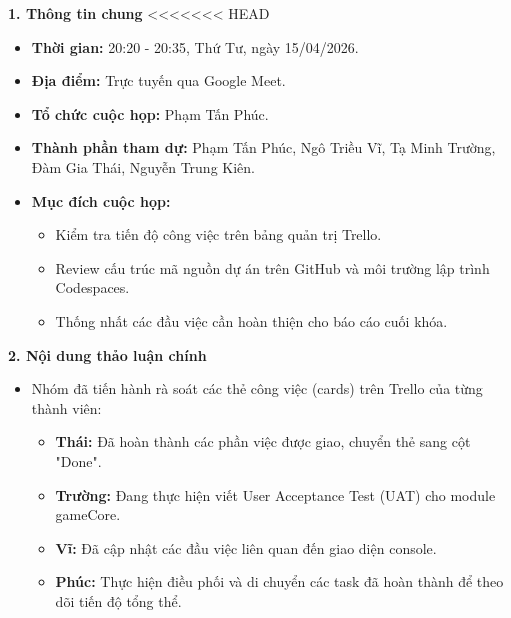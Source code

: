 \documentclass[12pt,a4paper]{article}
\begin{document}
\textbf{1. Thông tin chung}
<<<<<<< HEAD
\begin{itemize}
    \item \textbf{Thời gian:} 20:20 - 20:35, Thứ Tư, ngày 15/04/2026.
    \item \textbf{Địa điểm:} Trực tuyến qua Google Meet.
    \item \textbf{Tổ chức cuộc họp:} Phạm Tấn Phúc.
    \item \textbf{Thành phần tham dự:} Phạm Tấn Phúc, Ngô Triều Vĩ, Tạ Minh Trường, Đàm Gia Thái, Nguyễn Trung Kiên.
    \item \textbf{Mục đích cuộc họp:}
    \begin{itemize}
        \item Kiểm tra tiến độ công việc trên bảng quản trị Trello.
        \item Review cấu trúc mã nguồn dự án trên GitHub và môi trường lập trình Codespaces.
        \item Thống nhất các đầu việc cần hoàn thiện cho báo cáo cuối khóa.
    \end{itemize}
\end{itemize}

\vspace{4pt}
\textbf{2. Nội dung thảo luận chính}

\begin{itemize}
    \item Nhóm đã tiến hành rà soát các thẻ công việc (cards) trên Trello của từng thành viên:
    \begin{itemize}
        \item \textbf{Thái:} Đã hoàn thành các phần việc được giao, chuyển thẻ sang cột "Done".
        \item \textbf{Trường:} Đang thực hiện viết User Acceptance Test (UAT) cho module gameCore.
        \item \textbf{Vĩ:} Đã cập nhật các đầu việc liên quan đến giao diện console.
        \item \textbf{Phúc:} Thực hiện điều phối và di chuyển các task đã hoàn thành để theo dõi tiến độ tổng thể.
    \end{itemize}
\end{itemize}
\end{document}
